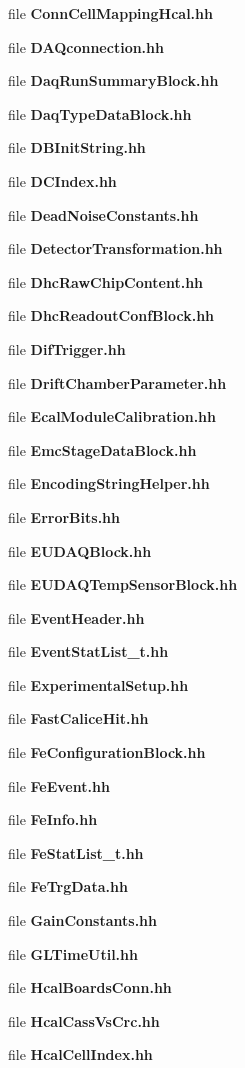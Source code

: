 \begin{DoxyCompactItemize}
file {\bfseries ConnCellMappingHcal.hh}
\item 
file {\bfseries DAQconnection.hh}
\item 
file {\bfseries DaqRunSummaryBlock.hh}
\item 
file {\bfseries DaqTypeDataBlock.hh}
\item 
file {\bfseries DBInitString.hh}
\item 
file {\bfseries DCIndex.hh}
\item 
file {\bfseries DeadNoiseConstants.hh}
\item 
file {\bfseries DetectorTransformation.hh}
\item 
file {\bfseries DhcRawChipContent.hh}
\item 
file {\bfseries DhcReadoutConfBlock.hh}
\item 
file {\bfseries DifTrigger.hh}
\item 
file {\bfseries DriftChamberParameter.hh}
\item 
file {\bfseries EcalModuleCalibration.hh}
\item 
file {\bfseries EmcStageDataBlock.hh}
\item 
file {\bfseries EncodingStringHelper.hh}
\item 
file {\bfseries ErrorBits.hh}
\item 
file {\bfseries EUDAQBlock.hh}
\item 
file {\bfseries EUDAQTempSensorBlock.hh}
\item 
file {\bfseries EventHeader.hh}
\item 
file {\bfseries EventStatList\_\-t.hh}
\item 
file {\bfseries ExperimentalSetup.hh}
\item 
file {\bfseries FastCaliceHit.hh}
\item 
file {\bfseries FeConfigurationBlock.hh}
\item 
file {\bfseries FeEvent.hh}
\item 
file {\bfseries FeInfo.hh}
\item 
file {\bfseries FeStatList\_\-t.hh}
\item 
file {\bfseries FeTrgData.hh}
\item 
file {\bfseries GainConstants.hh}
\item 
file {\bfseries GLTimeUtil.hh}
\item 
file {\bfseries HcalBoardsConn.hh}
\item 
file {\bfseries HcalCassVsCrc.hh}
\item 
file {\bfseries HcalCellIndex.hh}
\item 

\end{DoxyCompactItemize}
